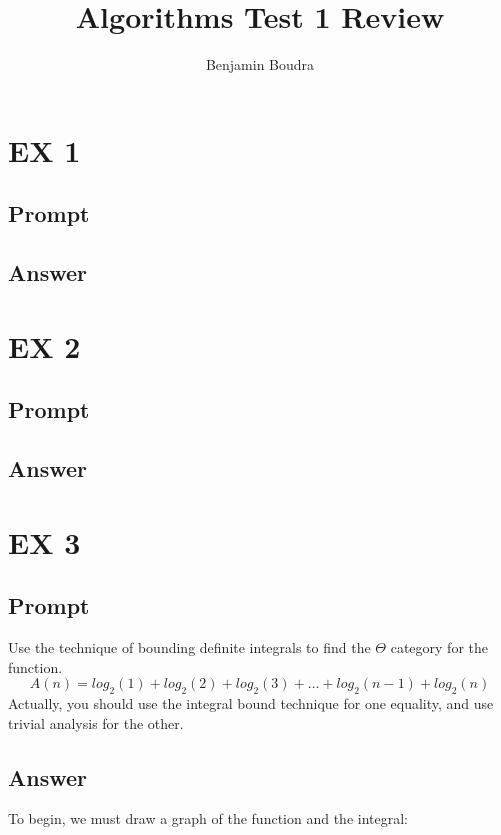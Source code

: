 \documentclass[10pt,a4paper]{article}
\title{Algorithms Test 1 Review}
\author{Benjamin Boudra}
\begin{document}
\maketitle
\tableofcontents
\section{EX 1}
\subsection{Prompt}
\subsection{Answer}

\section{EX 2}
\subsection{Prompt}
\subsection{Answer}

\section{EX 3}
\subsection{Prompt}
Use the technique of bounding definite integrals to find the $\Theta$ category for the function.
\begin{equation}
  A (n) = log_2(1) + log_2(2) + log_2(3) + \ldots + log_2(n-1) + log_2(n)
\end{equation}
Actually, you should use the integral bound technique for one equality, and use trivial analysis for the other.
\subsection{Answer}
To begin, we must draw a graph of the function and the integral:\\
\end{document}
